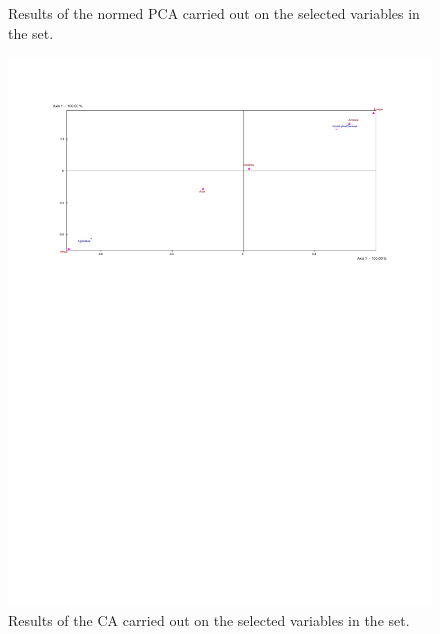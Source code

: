 \documentclass[a4paper,10pt,twocolumn]{article}
\begin{document}
\begin{figure}[!ht]
\begin{center}
\caption{\footnotesize{Results of the normed PCA carried out on the selected  variables in the set.}\label{r1}}
\end{center}
\end{figure}


\begin{figure}[!ht]
\begin{center}
\includegraphics[width=17cm]{r2a.pdf}
\caption{\footnotesize{Results of the CA carried out on the selected variables in the set.}\label{r2}}
\end{center}
\end{figure}


\newpage
\end{document}

